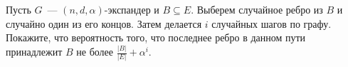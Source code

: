 Пусть $G$~--- $(n, d, \alpha)$-экспандер и $B \subseteq E$. Выберем случайное ребро из $B$ и случайно
один из его концов. Затем делается $i$ случайных шагов по графу. Покажите, что вероятность того, что
последнее ребро в данном пути принадлежит $B$ не более $\frac{|B|}{|E|} + \alpha^i$.
